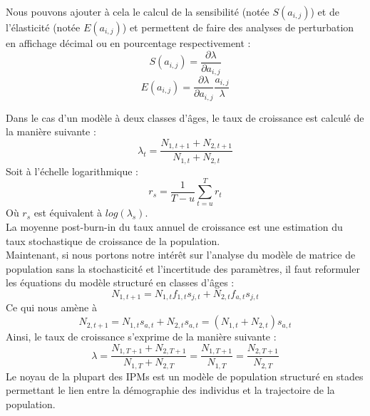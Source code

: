\documentclass[12pt,a4paper]{article}
\begin{document}
Nous pouvons ajouter à cela le calcul de la sensibilité (notée $S(a_{i, j})$) et de l'élasticité (notée $E(a_{i, j})$) et permettent de faire des analyses de perturbation en affichage décimal ou en pourcentage respectivement :
\begin{equation}
S(a_{i, j})=\dfrac{\partial\lambda}{\partial a_{i, j}}
\end{equation}
\begin{equation}
E(a_{i, j})=\dfrac{\partial\lambda}{\partial a_{i, j}} \dfrac{a_{i, j}}{\lambda}
\end{equation}

Dans le cas d'un modèle à deux classes d'âges, le taux de croissance est calculé de la manière suivante : 
\begin{equation}
\lambda_{t}=\dfrac{N_{1, t+1}+N_{2, t+1}}{N_{1, t}+N_{2, t}}
\end{equation}
Soit à l'échelle logarithmique :
\begin{equation}
r_{s}=\dfrac{1}{T-u}\sum_{t=u}^{T}r_t
\end{equation}
Où $r_s$ est équivalent à $log(\lambda_s)$.\\La moyenne post-burn-in du taux annuel de croissance est une estimation du taux stochastique de croissance de la population.  
\\
Maintenant, si nous portons notre intérêt sur l'analyse du modèle de matrice de population sans la stochasticité et l'incertitude des paramètres, il faut reformuler les équations du modèle structuré en classes d'âges :
\begin{equation}
N_{1, t+1}=N_{1, t}f_{1, t}s_{j, t}+N_{2, t}f_{a, t}s_{j, t}
\end{equation}
Ce qui nous amène à 
\begin{equation}
N_{2, t+1}=N_{1, t}s_{a, t}+N_{2, t}s_{a, t}=(N_{1, t}+N_{2, t})s_{a, t}
\end{equation}
Ainsi, le taux de croissance s'exprime de la manière suivante :
\begin{equation}
\lambda=\dfrac{N_{1, T+1}+N_{2, T+1}}{N_{1, T}+N_{2, T}}=\dfrac{N_{1, T+1}}{N_{1, T}}=\dfrac{N_{2, T+1}}{N_{2, T}}
\end{equation}
Le noyau de la plupart des IPMs est un modèle de population structuré en stades permettant le lien entre la démographie des individus et la trajectoire de la population.
\end{document}
